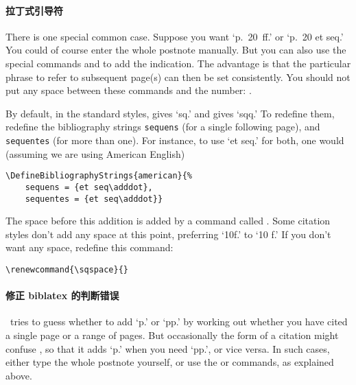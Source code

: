 \paragraph{拉丁式引导符} There is one special
common case. Suppose you want `p.~20~ff.' or `p.~20 et seq.'  You
could of course enter the whole postnote manually. But you can also
use the special commands  and  to
add the indication. The advantage is that the particular phrase to
refer to subsequent page(s) can then be set consistently. You should
not put any space between these commands and the number:
.

By default, in the standard styles,  gives `sq.' and 
gives `sqq.' To redefine them, redefine the bibliography strings
\verb|sequens| (for a single following page), and \verb|sequentes|
(for more than one). For instance, to use `et seq.' for both, one
would (assuming we are using American English)
\begin{verbatim}
\DefineBibliographyStrings{american}{%
    sequens = {et seq\adddot},
    sequentes = {et seq\adddot}}
\end{verbatim}
The space before this addition is added by a command called
. Some citation styles don't add any space at this point,
preferring `10f.' to `10 f.' If you don't want any space, redefine
this command:
\begin{center}
\verb|\renewcommand{\sqspace}{}|
\end{center}

\paragraph{修正 biblatex 的判断错误} \biblatex\ tries to
guess whether to add `p.' or `pp.' by working out whether you have
cited a single page or a range of pages. But occasionally the form of
a citation might confuse \biblatex, so that it adds `p.' when you need
`pp.', or vice versa. In such cases, either type the whole postnote
yourself, or use the  or  commands, as explained
above.

